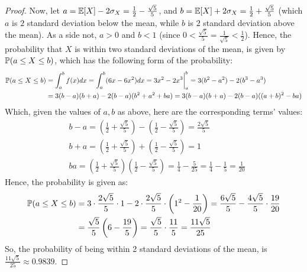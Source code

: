 \documentclass{article}
\begin{document}
\begin{proof}
    Now, let $a = \mathbb{E}[X]-2\sigma_X = \frac{1}{2}-\frac{\sqrt{5}}{5}$, and $b=\mathbb{E}[X]+2\sigma_X = \frac{1}{2}+\frac{\sqrt{5}}{5}$ (which $a$ is $2$ standard deviation below the mean, while $b$ is $2$ standard deviation above the mean). As a side not, $a>0$ and $b<1$ (since $0<\frac{\sqrt{5}}{5}=\frac{1}{\sqrt{5}}<\frac{1}{2}$). Hence, the probability that $X$ is within two standard deviations of the mean, is given by $\mathbb{P}(a\leq X\leq b)$, which has the following form of the probability:
    \begin{align}
        \mathbb{P}(a\leq X\leq b)&=\int_{a}^{b}f(x)dx = \int_{a}^{b}(6x-6x^2)dx = 3x^2-2x^3\bigg|_{a}^{b} = 3(b^2-a^2) - 2(b^3-a^3)\\
        &= 3(b-a)(b+a) - 2(b-a)(b^2+a^2+ba) = 3(b-a)(b+a)-2(b-a)((a+b)^2-ba)
    \end{align}
    Which, given the values of $a,b$ as above, here are the corresponding terms' values:
    \begin{align}
        &b-a = \left(\frac{1}{2}+\frac{\sqrt{5}}{5}\right)-\left(\frac{1}{2}-\frac{\sqrt{5}}{5}\right) = \frac{2\sqrt{5}}{5}\\
        &b+a = \left(\frac{1}{2}+\frac{\sqrt{5}}{5}\right)+\left(\frac{1}{2}-\frac{\sqrt{5}}{5}\right) = 1\\
        &ba = \left(\frac{1}{2}+\frac{\sqrt{5}}{5}\right)\left(\frac{1}{2}-\frac{\sqrt{5}}{5}\right) = \frac{1}{4}-\frac{5}{25} = \frac{1}{4}-\frac{1}{5}=\frac{1}{20}
    \end{align}
    Hence, the probability is given as:
    \begin{align}
        \mathbb{P}(a\leq X\leq b)&=3\cdot \frac{2\sqrt{5}}{5}\cdot 1 - 2\cdot\frac{2\sqrt{5}}{5}\cdot\left(1^2 - \frac{1}{20}\right) = \frac{6\sqrt{5}}{5}-\frac{4\sqrt{5}}{5}\cdot\frac{19}{20}\\
        &= \frac{\sqrt{5}}{5}\left(6-\frac{19}{5}\right) = \frac{\sqrt{5}}{5}\cdot\frac{11}{5} = \frac{11\sqrt{5}}{25}
    \end{align}
    So, the probability of being within 2 standard deviations of the mean, is $\frac{11\sqrt{5}}{25}\approx 0.9839$.
\end{proof}
\end{document}

